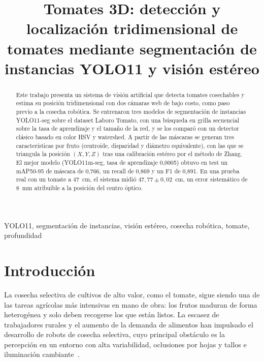 \documentclass[conference]{IEEEtran}
\begin{document}
\title{Tomates 3D: detección y localización tridimensional de tomates mediante segmentación de instancias YOLO11 y visión estéreo}

\author{
\and
{}
}

\maketitle

\begin{abstract}
Este trabajo presenta un sistema de visión artificial que detecta tomates cosechables y estima su posición tridimensional con dos cámaras web de bajo costo, como paso previo a la cosecha robótica. Se entrenaron tres modelos de segmentación de instancias YOLO11-seg sobre el dataset Laboro Tomato, con una búsqueda en grilla secuencial sobre la tasa de aprendizaje y el tamaño de la red, y se los comparó con un detector clásico basado en color HSV y watershed. A partir de las máscaras se generan tres características por fruto (centroide, disparidad y diámetro equivalente), con las que se triangula la posición $(X,Y,Z)$ tras una calibración estéreo por el método de Zhang. El mejor modelo (YOLO11m-seg, tasa de aprendizaje 0,0005) obtuvo en test un mAP50-95 de máscara de 0,766, un recall de 0,869 y un F1 de 0,891. En una prueba real con un tomate a 47~cm, el sistema midió $47{,}77\pm0{,}02$~cm, un error sistemático de 8~mm atribuible a la posición del centro óptico.
\end{abstract}

\begin{IEEEkeywords}
YOLO11, segmentación de instancias, visión estéreo, cosecha robótica, tomate, profundidad
\end{IEEEkeywords}

\section{Introducción}
La cosecha selectiva de cultivos de alto valor, como el tomate, sigue siendo una de las tareas agrícolas más intensivas en mano de obra: los frutos maduran de forma heterogénea y solo deben recogerse los que están listos. La escasez de trabajadores rurales y el aumento de la demanda de alimentos han impulsado el desarrollo de robots de cosecha selectiva, cuyo principal obstáculo es la percepción en un entorno con alta variabilidad, oclusiones por hojas y tallos e iluminación cambiante~\cite{kootstra2021,rajendran2024}.
\end{document}
